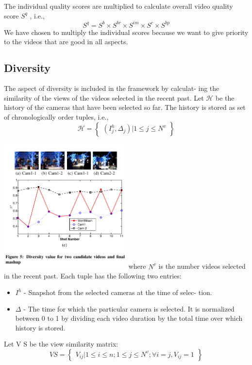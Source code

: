 \documentclass{sig-alternate}
\providecommand{\DIFadd}[1]{{\protect\color{blue}\uwave{#1}}} %
\providecommand{\DIFaddbegin}{} %
\providecommand{\DIFaddend}{} %
\begin{document}
\begin{itemize}
The individual quality scores are multiplied to calculate overall
video quality score $S^q$ , i.e.,
\[S^q = S^b \times S^{br}\times S^{im}\times S^c\times S^{bp}\tag{12}\]
We have chosen to multiply the individual scores because we
want to give priority to the videos that are good in all aspects.
 \end{itemize} 


\subsection{Diversity}
\DIFaddbegin \DIFadd{I am a new sentence.
}\DIFaddend The aspect of diversity is included in the framework by calculat-
ing the similarity of the views of the videos selected in the recent
past. Let $\mathcal{H}$ be the history of the cameras that have been selected
so far. The history is stored as set of chronologically order tuples,
i.e.,
\[\mathcal{H} = \begin{Bmatrix} (I^h_j,\Delta _j)|1 \le j \le N^v \end{Bmatrix}\tag{13}\]

\includegraphics[width=0.5\textwidth, left]{four.pdf}
where $N^v$ is the number videos selected in the recent past. Each
tuple has the following two entries:
 \begin{itemize} 
\item $I^h$ - Snapshot from the selected cameras at the time of selec-
tion.
\item $\Delta$ - The time for which the particular camera is selected. It
is normalized between 0 to 1 by dividing each video duration
by the total time over which history is stored.
 \end{itemize} 
Let V S be the view similarity matrix:
\[VS = \begin{Bmatrix} V_{ij}|1 \le i \le n; 1\le j \le N^v; \forall i = j, V_{ij} = 1 \end{Bmatrix}\tag{14}\]
\end{document}
